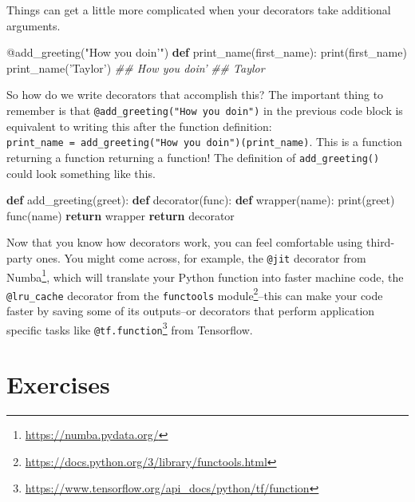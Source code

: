 \documentclass[12pt,krantz2]{krantz}
\makeatletter
\newenvironment{Shaded}{\begin{snugshade}}{\end{snugshade}}
\newcommand{\AttributeTok}[1]{\textcolor[rgb]{0.61,0.61,0.61}{#1}}
\newcommand{\BuiltInTok}[1]{#1}
\newcommand{\CommentTok}[1]{\textcolor[rgb]{0.37,0.37,0.37}{\textit{#1}}}
\newcommand{\ControlFlowTok}[1]{\textcolor[rgb]{0.27,0.27,0.27}{\textbf{#1}}}
\newcommand{\KeywordTok}[1]{\textcolor[rgb]{0.27,0.27,0.27}{\textbf{#1}}}
\newcommand{\NormalTok}[1]{#1}
\newcommand{\StringTok}[1]{\textcolor[rgb]{0.5,0.5,0.5}{#1}}
\renewcommand{\href}[2]{#2\footnote{\url{#1}}}
\newenvironment{kframe}{%
\medskip{}
\setlength{\fboxsep}{.8em}
 \def\at@end@of@kframe{}%
 \ifinner\ifhmode%
  \def\at@end@of@kframe{\end{minipage}}%
  \begin{minipage}{\columnwidth}%
 \fi\fi%
 \def\FrameCommand##1{\hskip\@totalleftmargin \hskip-\fboxsep
 \colorbox{shadecolor}{##1}\hskip-\fboxsep
     \hskip-\linewidth \hskip-\@totalleftmargin \hskip\columnwidth}%
 \MakeFramed {\advance\hsize-\width
   \@totalleftmargin\z@ \linewidth\hsize
   \@setminipage}}%
 {\par\unskip\endMakeFramed%
 \at@end@of@kframe}
\renewenvironment{Shaded}{\begin{kframe}}{\end{kframe}}
\makeatother
\begin{document}
Things can get a little more complicated when your decorators take additional arguments.

\begin{Shaded}
\begin{Highlighting}[]
\AttributeTok{@add_greeting}\NormalTok{(}\StringTok{"How you doin'"}\NormalTok{)}
\KeywordTok{def}\NormalTok{ print_name(first_name):}
    \BuiltInTok{print}\NormalTok{(first_name)}
\NormalTok{print_name(}\StringTok{'Taylor'}\NormalTok{)}
\CommentTok{## How you doin'}
\CommentTok{## Taylor}
\end{Highlighting}
\end{Shaded}

So how do we write decorators that accomplish this? The important thing to remember is that \texttt{@add\_greeting("How\ you\ doin\textquotesingle{}")} in the previous code block is equivalent to writing this after the function definition: \texttt{print\_name\ =\ add\_greeting("How\ you\ doin\textquotesingle{}")(print\_name)}. This is a function returning a function returning a function! The definition of \texttt{add\_greeting()} could look something like this.

\begin{Shaded}
\begin{Highlighting}[]
\KeywordTok{def}\NormalTok{ add_greeting(greet):}
    \KeywordTok{def}\NormalTok{ decorator(func):}
        \KeywordTok{def}\NormalTok{ wrapper(name):}
            \BuiltInTok{print}\NormalTok{(greet)}
\NormalTok{            func(name)}
        \ControlFlowTok{return}\NormalTok{ wrapper}
    \ControlFlowTok{return}\NormalTok{ decorator}
\end{Highlighting}
\end{Shaded}

Now that you know how decorators work, you can feel comfortable using third-party ones. You might come across, for example, the \texttt{@jit} decorator from \href{https://numba.pydata.org/}{Numba}, which will translate your Python function into faster machine code, the \texttt{@lru\_cache} decorator from the \href{https://docs.python.org/3/library/functools.html}{\texttt{functools} module}--this can make your code faster by saving some of its outputs--or decorators that perform application specific tasks like \href{https://www.tensorflow.org/api_docs/python/tf/function}{\texttt{@tf.function}} from Tensorflow.

\hypertarget{exercises-12}{%
\section{Exercises}\label{exercises-12}}
\end{document}
